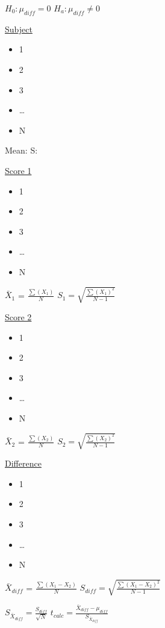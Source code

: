 \documentclass[11pt]{report}
\begin{document}
{
    $H_0 : \mu_{diff} = 0$ \newline 
    $H_a : \mu_{diff} \neq 0$ \newline

    \begin{multicols}{4}
        \underline{Subject}
        \begin{itemize}
            \item 1
            \item 2
            \item 3
            \item \dots
            \item N
        \end{itemize}
        Mean: \newline
        S: 
        \columnbreak

        \underline{Score 1}
        \begin{itemize}
            \item 1
            \item 2
            \item 3
            \item \dots
            \item N
        \end{itemize}
        $\bar{X}_{1}$ = $\frac{\sum(X_1)}{N}$ \newline
        $S_{1} = \sqrt{\frac{\sum(X_1)^2}{N - 1}}$ \newline
        \columnbreak

        \underline{Score 2}
        \begin{itemize}
            \item 1
            \item 2
            \item 3
            \item \dots
            \item N
        \end{itemize}
        $\bar{X}_{2}$ = $\frac{\sum(X_2)}{N}$ \newline
        $S_{2} = \sqrt{\frac{\sum(X_2)^2}{N - 1}}$ \newline
        \columnbreak

        \underline{Difference}
        \begin{itemize}
            \item 1
            \item 2
            \item 3
            \item \dots
            \item N
        \end{itemize}
        $\bar{X}_{diff}$ = $\frac{\sum(X_1 - X_2)}{N}$ \newline
        $S_{diff} = \sqrt{\frac{\sum(X_1 - X_2)^2}{N - 1}}$ \newline
    \end{multicols}

    $S_{\bar{X}_{diff}} = \frac{S_{diff}}{\sqrt{N}}$ \newline
    $t_{calc} = \frac{\bar{X}_{diff} - \mu_{diff}}{S_{\bar{X}_{diff}}}$ \newline
}
\end{document}
